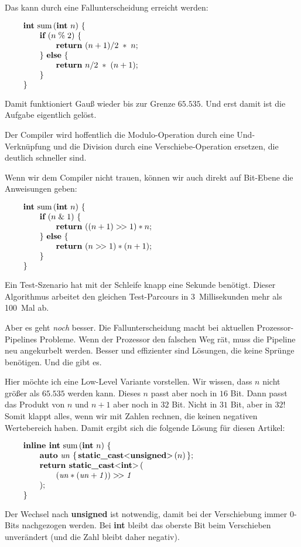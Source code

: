 Das kann durch eine Fallunterscheidung erreicht werden:

$$\vbox{\obeylines
{\bf int} sum$\,$({\bf int} $n$) $\{$
\qquad {\bf if} ($n\mathrel\% 2$) $\{$
\qquad\qquad {\bf return} $(n + 1)/2\;*\;n$;
\qquad $\}$ {\bf else} $\{$
\qquad\qquad {\bf return} $n/2 \;*\; (n + 1)$;
\qquad $\}$
$\}$}$$

\noindent Damit funktioniert Gauß wieder bis zur Grenze $65.535$.
Und erst damit ist die Aufgabe eigentlich gelöst.

Der Compiler wird hoffentlich die Modulo-Operation durch eine
Und-Verknüpfung und die Division durch eine
Verschiebe-Operation ersetzen, die deutlich schneller sind.

Wenn wir dem Compiler nicht trauen, können wir auch direkt
auf Bit-Ebene die Anweisungen geben:

$$\vbox{\obeylines
{\bf int} sum$\,$({\bf int} $n$) $\{$
\qquad {\bf if} ($n \mathrel\& 1$) $\{$
\qquad\qquad {\bf return} $((n + 1) >\!> 1) * n$;
\qquad $\}$ {\bf else} $\{$
\qquad\qquad {\bf return} $(n >\!> 1) * (n + 1)$;
\qquad $\}$
$\}$}$$

\noindent Ein Test-Szenario hat mit der Schleife knapp eine Sekunde benötigt.
Dieser Algorithmus arbeitet den gleichen Test-Parcours in 3~Millisekunden
mehr als 100~Mal ab.

Aber es geht {\it noch\/} besser.
Die Fallunterscheidung macht bei aktuellen Prozessor-Pipelines
Probleme.
Wenn der Prozessor den falschen Weg rät, muss die
Pipeline neu angekurbelt werden.
Besser und effizienter sind Lösungen, die keine
Sprünge benötigen.
Und die gibt es.

Hier möchte ich eine Low-Level Variante vorstellen.
Wir wissen, dass $n$ nicht größer als $65.535$ werden
kann.
Dieses $n$ passt aber noch in $16$ Bit.
Dann passt das Produkt von $n$ und $n+1$ aber noch in
$32$ Bit.
Nicht in $31$ Bit, aber in $32$!
Somit klappt alles, wenn wir mit Zahlen rechnen, die
keinen negativen Wertebereich haben.
Damit ergibt sich die folgende Lösung für diesen Artikel:

$$\vbox{\obeylines
{\bf inline int} sum$\,$({\bf int} $n$) $\{$
\qquad {\bf auto} $\it un$ $\{\,${\bf static\_cast}<{\bf unsigned}>$\,$($n$)$\,\}$;
\qquad {\bf return static\_cast}<{\bf int}>$\,$(
\qquad\qquad $(\it un * (\it un + 1)) >\!> 1$
\qquad );
$\}$}$$

\noindent Der Wechsel nach {\bf unsigned} ist notwendig, damit
bei der Verschiebung immer $0$-Bits nachgezogen werden.
Bei {\bf int} bleibt das oberste Bit beim Verschieben unverändert
(und die Zahl bleibt daher negativ).

